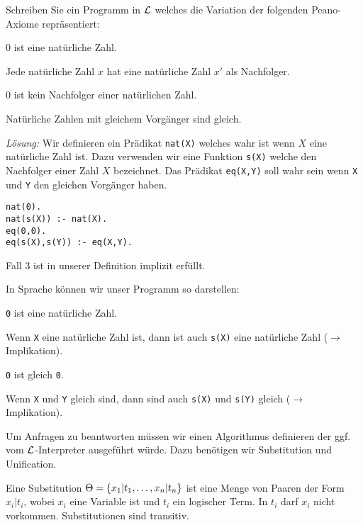 \begin{bsp}
Schreiben Sie ein Programm in $\mathcal{L}$ welches die Variation der folgenden Peano-Axiome repräsentiert:
\begin{\whichenum}
\item $0$ ist eine natürliche Zahl.
\item Jede natürliche Zahl $x$ hat eine natürliche Zahl $x'$ als Nachfolger.
\item $0$ ist kein Nachfolger einer natürlichen Zahl.
\item Natürliche Zahlen mit gleichem Vorgänger sind gleich.
\end{\whichenum}

\textit{Lösung:} Wir definieren ein Prädikat \verb|nat(X)| welches wahr ist wenn $X$ eine natürliche Zahl ist.
Dazu verwenden wir eine Funktion \verb|s(X)| welche den Nachfolger einer Zahl $X$ bezeichnet.
Das Prädikat \verb|eq(X,Y)| soll wahr sein wenn \verb|X| und \verb|Y| den gleichen Vorgänger haben.
\begin{verbatim}
nat(0).
nat(s(X)) :- nat(X).
eq(0,0).
eq(s(X),s(Y)) :- eq(X,Y).
\end{verbatim}
Fall 3 ist in unserer Definition implizit erfüllt.

In Sprache können wir unser Programm so darstellen:
\begin{\whichenum}
\item \verb|0| ist eine natürliche Zahl.
\item Wenn \verb|X| eine natürliche Zahl ist, dann ist auch \verb|s(X)| eine natürliche Zahl ($\to$ Implikation).
\item \verb|0| ist gleich \verb|0|.
\item Wenn \verb|X| und \verb|Y| gleich sind, dann sind auch \verb|s(X)| und \verb|s(Y)| gleich ($\to$ Implikation).
\end{\whichenum}
\end{bsp}

Um Anfragen zu beantworten müssen wir einen Algorithmus definieren der ggf.
vom $\mathcal{L}$-Interpreter ausgeführt würde. Dazu benötigen wir Substitution und
Unification.
\begin{defn}[Variablensubstitution]
Eine Substitution $\Theta = \left\{x_1 | t_1, \ldots, x_n | t_n\right\}$ ist eine Menge von Paaren der Form
$x_i | t_i$, wobei $x_i$ eine Variable ist und $t_i$ ein logischer Term.
In $t_i$ darf $x_i$ nicht vorkommen. Substitutionen sind transitiv.
\end{defn}

